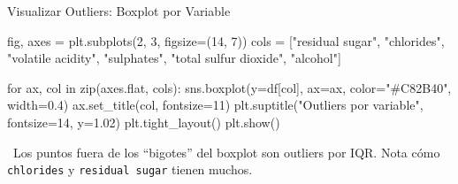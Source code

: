 \documentclass[aspectratio=169, 11pt]{beamer}
\begin{document}
\begin{frame}[fragile,shrink=28]{Visualizar Outliers: Boxplot por Variable}
  \vspace{-6pt}
  \begin{pyblock}
fig, axes = plt.subplots(2, 3, figsize=(14, 7))
cols = ["residual sugar", "chlorides", "volatile acidity",
        "sulphates", "total sulfur dioxide", "alcohol"]

for ax, col in zip(axes.flat, cols):
    sns.boxplot(y=df[col], ax=ax, color="#C82B40", width=0.4)
    ax.set_title(col, fontsize=11)
plt.suptitle("Outliers por variable", fontsize=14, y=1.02)
plt.tight_layout()
plt.show()
  \end{pyblock}

  \vspace{4pt}
  {\scriptsize\color{textMuted}
    \faLightbulb\ Los puntos fuera de los ``bigotes'' del boxplot son outliers por IQR.
    Nota cómo \texttt{chlorides} y \texttt{residual sugar} tienen muchos.}
\end{frame}
\end{document}
